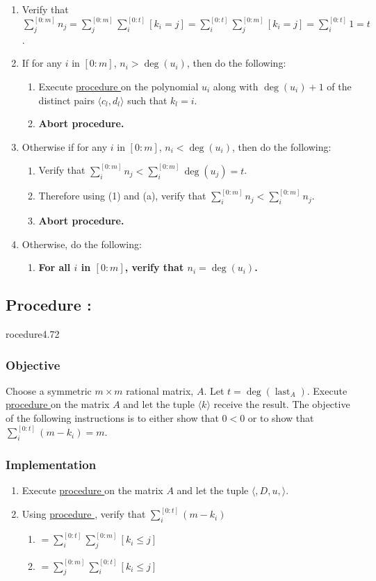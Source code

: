 \documentclass{article}
\DeclareMathOperator{\last}{last}
\newcounter{procedure}[part]
\newcommand{\procedure}[1]{\subsection*{Procedure \thepart:\theprocedure}\label{sec:procedure #1}\global\expandafter\edef\csname procedure#1\endcsname{\thepart:\theprocedure}\addtocounter{procedure}{1}}
\newcommand{\objective}{\subsubsection*{Objective}}
\newcommand{\implementation}{\subsubsection*{Implementation}}
\newcommand{\procedurehr}[1]{\hyperref[sec:procedure #1]{procedure \expandafter\csname procedure#1\endcsname}}
\begin{document}
\begin{multicols}{2}
				\begin{enumerate}
					\item Verify that $\sum_j^{[0:m]} n_j=\sum_j^{[0:m]}\sum_i^{[0:t]} [k_i=j]=\sum_i^{[0:t]}\sum_j^{[0:m]} [k_i=j]=\sum_i^{[0:t]} 1=t$.
					\item If for any $i$ in $[0:m]$, $n_i>\deg(u_i)$, then do the following:
					\begin{enumerate}
						\item Execute \procedurehr{2.18} on the polynomial $u_i$ along with $\deg(u_i)+1$ of the distinct pairs $\langle c_l,d_l\rangle$ such that $k_l=i$.
						\item \textbf{Abort procedure.}
					\end{enumerate}
					\item Otherwise if for any $i$ in $[0:m]$, $n_i<\deg(u_i)$, then do the following:
					\begin{enumerate}
						\item Verify that $\sum_i^{[0:m]} n_j<\sum_i^{[0:m]} \deg(u_j)=t$.
						\item Therefore using (1) and (a), verify that $\sum_i^{[0:m]} n_j<\sum_i^{[0:m]} n_j$.
						\item \textbf{Abort procedure.}
					\end{enumerate}
					\item Otherwise, do the following:
					\begin{enumerate}
						\item \textbf{For all $i$ in $[0:m]$, verify that $n_i=\deg(u_i)$.}
					\end{enumerate}
				\end{enumerate}
		\procedure{4.72}
			\objective
				Choose a symmetric $m\times m$ rational matrix, $A$. Let $t=\deg(\last_A)$. Execute \procedurehr{4.66} on the matrix $A$ and let the tuple $\langle k\rangle$ receive the result. The objective of the following instructions is to either show that $0<0$ or to show that $\sum_i^{[0:t]}(m-k_i)=m$.
			\implementation
				\begin{enumerate}
					\item Execute \procedurehr{4.25} on the matrix $A$ and let the tuple $\langle,D,u,\rangle$.
					\item Using \procedurehr{4.67}, verify that $\sum_i^{[0:t]}(m-k_i)$
					\begin{enumerate}
						\item $=\sum_i^{[0:t]}\sum_j^{[0:m]} [k_i\le j]$
						\item $=\sum_j^{[0:m]}\sum_i^{[0:t]} [k_i\le j]$

\end{enumerate}
\end{enumerate}
\end{multicols}
\end{document}
